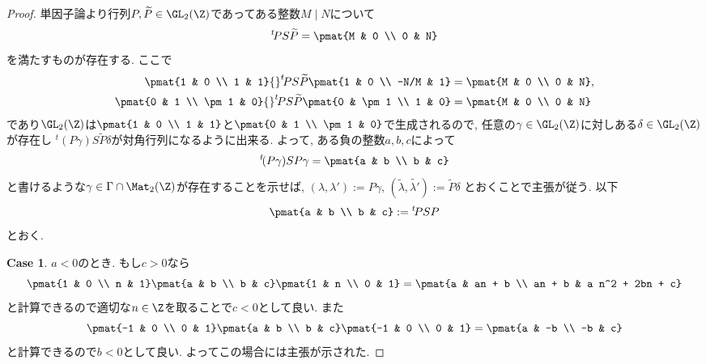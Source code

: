 \documentclass[11pt,b5paper,oneside,lualatex]{ltjsarticle} %
\numberwithin{equation}{section} %
\begin{document}
\begin{proof}
	単因子論より行列$ P, \widetilde{P} \in \GL_2(\Z) $であってある整数$ M \mid N $について
	\[
	{}^t\!P S \widetilde{P}
	= \pmat{M & 0 \\ 0 & N}
	\]
	を満たすものが存在する. 
	ここで
	\begin{align}
		\pmat{1 & 0 \\ 1 & 1}
		{}^t\!P S \widetilde{P}
		\pmat{1 & 0 \\ -N/M & 1}
		&=
		\pmat{M & 0 \\ 0 & N}, 
		\\
		\pmat{0 & 1 \\ \pm 1 & 0}
		{}^t\!P S \widetilde{P}
		\pmat{0 & \pm 1 \\ 1 & 0}
		&=
		\pmat{M & 0 \\ 0 & N}
	\end{align}
	であり$ \GL_2(\Z) $は$ \pmat{1 & 0 \\ 1 & 1} $と$ \pmat{0 & 1 \\ \pm 1 & 0} $で生成されるので, 任意の$ \gamma \in \GL_2(\Z) $に対しある$ \delta \in \GL_2(\Z) $が存在し
	$ {}^t\!(P \gamma) S \widetilde{P} \delta $が対角行列になるように出来る. 
	よって, ある負の整数$ a, b, c $によって
	\[
	{}^t\!(P \gamma) S P \gamma
	= \pmat{a & b \\ b & c}
	\]
	と書けるような$ \gamma \in \Gamma \cap \Mat_2(\Z) $が存在することを示せば,
	$ (\lambda, \lambda') := P \gamma, \, (\widetilde{\lambda}, \widetilde{\lambda'}) := \widetilde{P} \delta $
	とおくことで主張が従う. 
	以下
	\[
	\pmat{a & b \\ b & c}
	:= {}^t\!P S P
	\]
	とおく. 
	
	\textbf{Case 1}. $ a < 0 $のとき. 
	もし$ c > 0 $なら
	\[
	\pmat{1 & 0 \\ n & 1} \pmat{a & b \\ b & c} \pmat{1 & n \\ 0 & 1}
	=
	\pmat{a & an + b \\ an + b & a n^2 + 2bn + c}
	\]
	と計算できるので適切な$ n \in \Z $を取ることで$ c < 0 $として良い. 
	また
	\[
	\pmat{-1 & 0 \\ 0 & 1} \pmat{a & b \\ b & c} \pmat{-1 & 0 \\ 0 & 1}
	=
	\pmat{a & -b \\ -b & c}
	\]
	と計算できるので$ b < 0 $として良い. 
	よってこの場合には主張が示された. 
	

\end{proof}
\end{document}
